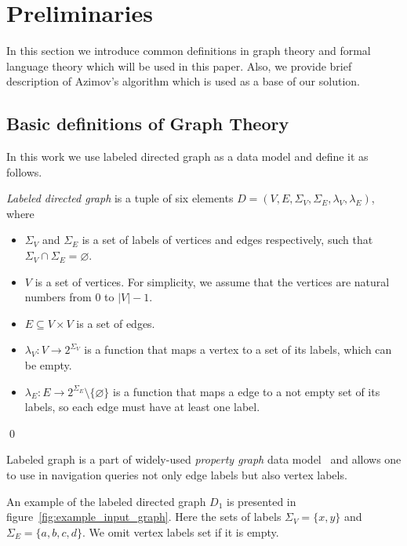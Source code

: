 \section{Preliminaries}

In this section we introduce common definitions in graph theory and formal language theory which will be used in this paper. 
Also, we provide brief description of Azimov's algorithm which is used as a base of our solution.

\subsection{Basic definitions of Graph Theory}

In this work we use labeled directed graph as a data model and define it as follows.
\begin{definition} \emph{Labeled directed graph} is a tuple of six elements $D = (V, E, \Sigma_V, \Sigma_E, \lambda_V, \lambda_E)$, where
\begin{itemize}
    \item $\Sigma_V$ and $\Sigma_E$ is a set of labels of vertices and edges respectively, such that $\Sigma_V \cap \Sigma_E = \varnothing$.
    \item $V$ is a set of vertices. For simplicity, we assume that the vertices are natural numbers from $0$ to $|V|-1$.
    \item $E \subseteq V \times V$ is a set of edges.
    \item $\lambda_V : V \xrightarrow{} 2^{\Sigma_V}$ is a function that maps a vertex to a set of its labels, which can be empty.
    \item $\lambda_E : E \xrightarrow{} 2^{\Sigma_E} \setminus \{\varnothing\}$ is a function that maps a edge to a not empty set of its labels, so each edge must have at least one label.
\end{itemize} \qed
\end{definition}

Labeled graph is a part of widely-used \textit{property graph} data model~\cite{Angles2018ThePG} and allows one to use in navigation queries not only edge labels but also vertex labels.

An example of the labeled directed graph $D_1$ is presented in figure~\ref{fig:example_input_graph}. Here the sets of labels $\Sigma_V = \{x, y\}$ and $\Sigma_E = \{a, b, c, d\}$. 
We omit vertex labels set if it is empty.

